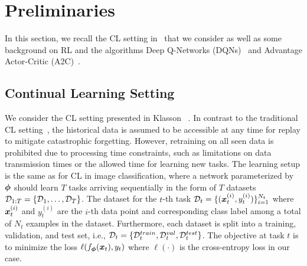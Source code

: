 
\section{Preliminaries}\label{paperD:sec:background}

In this section, we recall the CL setting in~ that we consider as well as some background on RL and the algorithms Deep Q-Networks (DQNs)~ and Advantage Actor-Critic (A2C)~. 


\subsection{Continual Learning Setting}
We consider the CL setting presented in Klasson \etal~. In contrast to the traditional CL setting~, the historical data is assumed to be accessible at any time for replay to mitigate catastrophic forgetting. However, retraining on all seen data is prohibited due to processing time constraints, such as limitations on data transmission times or the allowed time for learning new tasks. The learning setup is the same as for CL in image classification, where a network parameterized by ${\bm{\phi}}$ should learn $T$ tasks arriving sequentially in the form of $T$ datasets ${\mathcal{D}}_{1:T} = \{{\mathcal{D}}_1, \dots, {\mathcal{D}}_T\}$. The dataset for the $t$-th task ${\mathcal{D}}_t = \{({\bm{x}}_t^{(i)}, y_t^{(i)})\}_{i=1}^{N_t}$ where ${\bm{x}}_t^{(i)}$ and $y_t^{(i)}$ are the $i$-th data point and corresponding class label among a total of $N_t$ examples in the dataset. Furthermore, each dataset is split into a training, validation, and test set, i.e., ${\mathcal{D}}_t = \{{\mathcal{D}}_t^{train}, {\mathcal{D}}_t^{val}, {\mathcal{D}}_t^{test}\}$. The objective at task $t$ is to minimize the loss $\ell(f_{{\bm{\phi}}}({\bm{x}}_t), y_{t})$ where $\ell(\cdot)$ is the cross-entropy loss in our case. 

